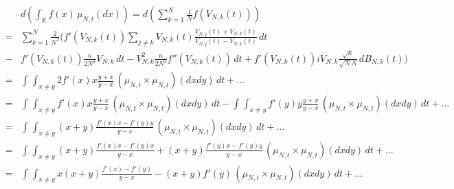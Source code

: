 \documentclass[a4paper,twoside,11pt]{article}
\theoremstyle{plain}
\theoremstyle{definition}
\theoremstyle{remark}
\newcommand\R{\mathbb R}         %
\begin{document}
\begin{eqnarray*}
 && d\left(\int_\R f(x) \, \mu_{N,t}(dx)\right) = 
d\left(\sum_{k=1}^N \frac{1}{N} f(V_{N,k}(t)) \right) \\
&=& \sum_{k=1}^N  \frac{2}{N^2}( f'(V_{N,k}(t))\sum_{j\not=k}V_{N,k}(t)\frac{V_{N,j}(t)+V_{N,k}(t)}{V_{N,j}(t)-V_{N,k}(t)}\,dt \\
&-& 
 f'(V_{N,k}(t)) \frac{\kappa}{2N^2}V_{N,k}\,dt
-V_{N,k}^2\frac{\kappa}{2N^2} f''(V_{N,k}(t)) \,dt +  f'(V_{N,k}(t))iV_{N,k}\frac{\sqrt{\kappa}}{\sqrt{N}N}\,dB_{N,k}(t) ) \\
&=& \int_{}\int_{x\not=y} 2f'(x)x\frac{y+x}{y-x} \,
(\mu_{N,t}\times \mu_{N,t})(dxdy) \,dt + \dots\\
&=& \int_{}\int_{x\not=y} f'(x)x\frac{y+x}{y-x} \,
(\mu_{N,t}\times \mu_{N,t})(dxdy) \,dt - \int_{}\int_{x\not=y} f'(y)y\frac{y+x}{y-x} \,
(\mu_{N,t}\times \mu_{N,t})(dxdy) \,dt + \dots\\
&=& \int_{}\int_{x\not=y} (x+y)\frac{f'(x)x-f'(y)y}{y-x} \,
(\mu_{N,t}\times \mu_{N,t})(dxdy) \,dt + \dots\\
&=& \int_{}\int_{x\not=y} (x+y)\frac{f'(x)x-f'(y)x}{y-x} +  (x+y)\frac{f'(y)x-f'(y)y}{y-x} \,
(\mu_{N,t}\times \mu_{N,t})(dxdy) \,dt + \dots\\
&=& \int_{}\int_{x\not=y} x(x+y)\frac{f'(x)-f'(y)}{y-x} -  (x+y)f'(y) \,
(\mu_{N,t}\times \mu_{N,t})(dxdy) \,dt + \dots\\
\end{eqnarray*} 
\end{document}
